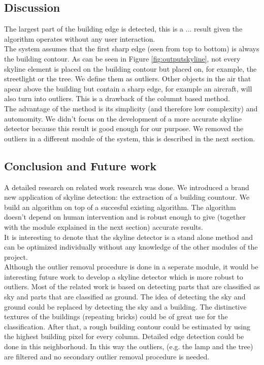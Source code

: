\subsection{Discussion}  %
The largest part of the building edge is detected, this is a ...
result given
the algorithm operates without any user interaction.\\
The system assumes that the first sharp edge (seen from top to bottom) is always
the building contour. As can be seen in Figure \ref{fig:outputskyline}, not
every skyline element is placed on the building contour but placed on, for
example, the streetlight or the tree. We define them as outliers.
Other objects in the air that apear above the building but contain a sharp edge,
for example an aircraft, will also turn into outliers.  This is a drawback of the
	columnt based method.\\
The advantage of the method is its simplicity (and therefore low complexity) and
automomity.  We didn't focus on the development of a more accurate skyline
detector because this result is good enough for our purpose. We removed the
outliers in a different module of the system, this is described in the next
section.  

\subsection{Conclusion and Future work}
A detailed research on related work research was done.
We introduced a brand new application of skyline detection: the extraction of a
building countour. We build an algorithm on top of a succesful existing
algorithm.  The algorithm doesn't depend on human intervention and is robust enough to give
(together with the module explained in the next section) accurate results.\\
It is interesting to denote that the skyline detector is a stand alone method and
can be optimized individually without any knowledge of the other modules of the
project.\\

Although the outlier removal procedure is done in a seperate module, it would be
interesting future work to develop a skyline detector which is more robust to outliers.
Most of the related work is based on detecting parts that are
classified as sky and parts that are classified as ground. The
idea of detecting the sky and ground could be replaced by detecting the sky and a building. The distinctive
textures of the buildings (repeating bricks) could be of great use for the
classification.  After that, a rough building contour could be estimated by using the highest building pixel for every column. Detailed edge detection could be
done in this neighborhoud. In this way the outliers, (e.g. the lamp and the
tree) are filtered and no secondary outlier removal procedure is needed.


